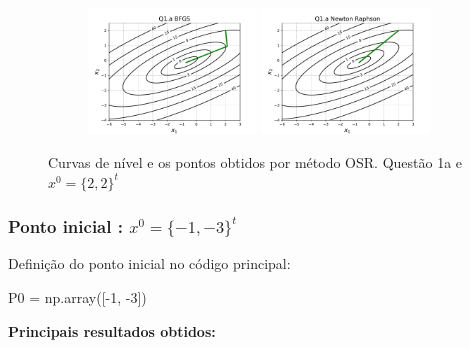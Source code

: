 \documentclass[10pt, a4paper]{article}
\begin{document}
\begin{figure}[H]
\begin{subfigure}[b]{\textwidth}
  \end{subfigure}
  \begin{subfigure}[b]{\textwidth}
    \includegraphics[width=0.49\textwidth]{figuras/Q1.a_BFGS_P0=[2 2].pdf}
    \includegraphics[width=0.49\textwidth]{figuras/Q1.a_Newton Raphson_P0=[2 2].pdf}
  \end{subfigure}
  \caption{Curvas de nível e os pontos obtidos por método OSR. Questão 1a e $x^0 = \{2,2\}^t$}
\end{figure}

\subsubsection{Ponto inicial : $x^0 = \{-1,-3\}^t$}
Definição do ponto inicial no código principal:
\begin{python}
  P0 = np.array([-1, -3])
\end{python}

\vspace{3mm}
\textbf{Principais resultados obtidos:}
\end{document}
